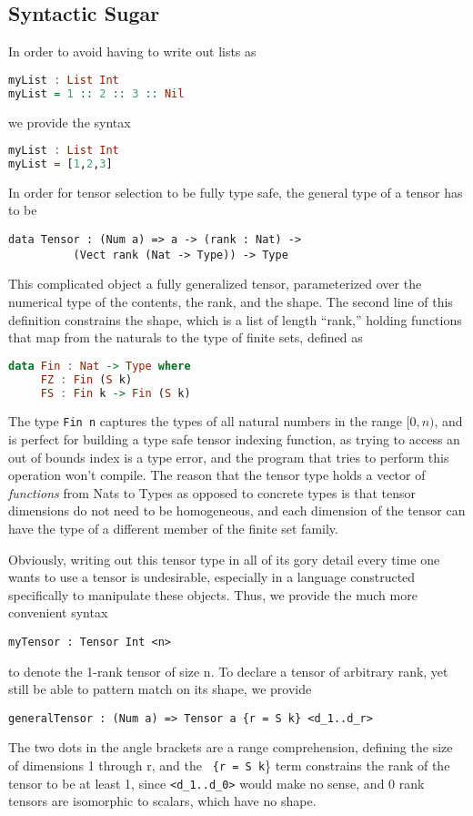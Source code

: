 \documentclass[12pt]{article}
\begin{document}
\subsection{Syntactic Sugar}
In order to avoid having to write out lists as 
\begin{lstlisting}[language=Haskell]
myList : List Int
myList = 1 :: 2 :: 3 :: Nil
\end{lstlisting}
we provide the syntax 
\begin{lstlisting}[language=Haskell]
myList : List Int
myList = [1,2,3]
\end{lstlisting}
In order for tensor selection to be fully type safe, the general type of a tensor has to be
\begin{lstlisting}
data Tensor : (Num a) => a -> (rank : Nat) -> 
	      (Vect rank (Nat -> Type)) -> Type
\end{lstlisting}
This complicated object a fully generalized tensor, parameterized over the numerical type of the contents, the rank, and the shape. The second line of this definition constrains the shape, which is a list of length ``rank,'' holding functions that map from the naturals to the type of finite sets, defined as 
\begin{lstlisting}[language=Haskell]
data Fin : Nat -> Type where
     FZ : Fin (S k)
     FS : Fin k -> Fin (S k)
\end{lstlisting}
The type \lstinline{Fin n}
captures the types of all natural numbers in the range $[0,n)$, and is perfect for building a type safe tensor indexing function, as trying to access an out of bounds index is a type error, and the program that tries to perform this operation won't compile. The reason that the tensor type holds a vector of \textit{functions} from Nats to Types as opposed to concrete types is that tensor dimensions do not need to be homogeneous, and each dimension of the tensor can have the type of a different member of the finite set family. 

Obviously, writing out this tensor type in all of its gory detail every time one wants to use a tensor is undesirable, especially in a language constructed specifically to manipulate these objects. Thus, we provide the much more convenient syntax 
\begin{lstlisting}
myTensor : Tensor Int <n>
\end{lstlisting}
to denote the 1-rank tensor of size n. To declare a tensor of arbitrary rank, yet still be able to pattern match on its shape, we provide
\begin{lstlisting}
generalTensor : (Num a) => Tensor a {r = S k} <d_1..d_r>
\end{lstlisting}
The two dots in the angle brackets are a range comprehension, defining the size of dimensions 1 through r, and the \lstinline{ {r = S k}\} term constrains the rank of the tensor to be at least 1, since 
\lstinline{<d_1..d_0>} would make no sense, and 0 rank tensors are isomorphic to scalars, which have no shape.
\end{document}
